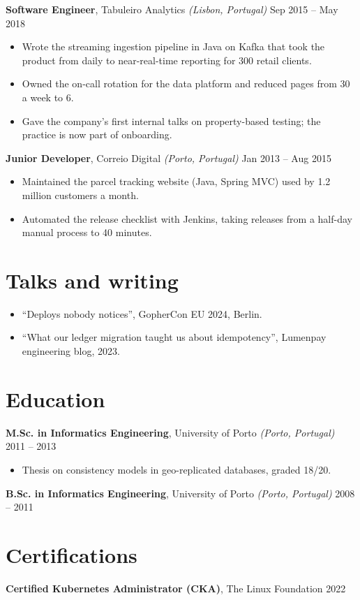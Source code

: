 \documentclass[10pt,a4paper]{article}
\begin{document}
\textbf{Software Engineer}, Tabuleiro Analytics \textit{(Lisbon, Portugal)} \hfill Sep 2015 -- May 2018\\[-2pt]
\begin{itemize}
\item Wrote the streaming ingestion pipeline in Java on Kafka that took the product from daily to near-real-time reporting for 300 retail clients.
\item Owned the on-call rotation for the data platform and reduced pages from 30 a week to 6.
\item Gave the company's first internal talks on property-based testing; the practice is now part of onboarding.
\end{itemize}
\textbf{Junior Developer}, Correio Digital \textit{(Porto, Portugal)} \hfill Jan 2013 -- Aug 2015\\[-2pt]
\begin{itemize}
\item Maintained the parcel tracking website (Java, Spring MVC) used by 1.2 million customers a month.
\item Automated the release checklist with Jenkins, taking releases from a half-day manual process to 40 minutes.
\end{itemize}
\section*{Talks and writing}
\begin{itemize}\item “Deploys nobody notices”, GopherCon EU 2024, Berlin.\item “What our ledger migration taught us about idempotency”, Lumenpay engineering blog, 2023.\end{itemize}
\section*{Education}
\textbf{M.Sc. in Informatics Engineering}, University of Porto \textit{(Porto, Portugal)} \hfill 2011 -- 2013\\[-2pt]
\begin{itemize}
\item Thesis on consistency models in geo-replicated databases, graded 18/20.
\end{itemize}
\textbf{B.Sc. in Informatics Engineering}, University of Porto \textit{(Porto, Portugal)} \hfill 2008 -- 2011\\[-2pt]
\vspace{3pt}
\section*{Certifications}
\textbf{Certified Kubernetes Administrator (CKA)}, The Linux Foundation \hfill 2022\\[-2pt]
\vspace{3pt}
\end{document}
